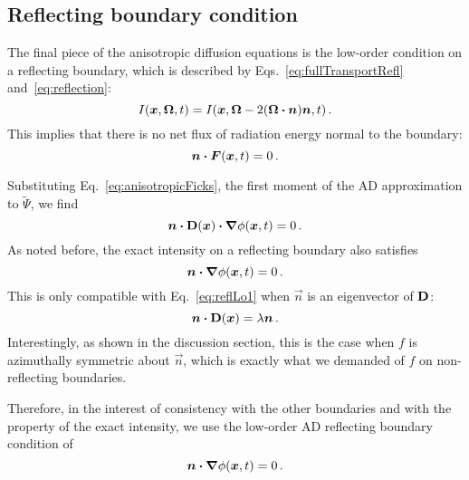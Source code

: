 \subsection{Reflecting boundary condition}
The final piece of the anisotropic diffusion equations is the low-order
condition on a reflecting boundary, which is described by
Eqs.~\eqref{eq:fullTransportRefl} and~\eqref{eq:reflection}:
\begin{equation*}
  I(\bm{x}, \bm{\Omega}, t)
  = I(\bm{x}, \bm{\Omega} - 2(\bm{\Omega} \bm{\cdot} \bm{n}) \bm{n}, t) \,.
\end{equation*}
This implies that there is no net flux of radiation energy normal to the
boundary:
\begin{equation}\label{eq:reflFirst}
  \bm{n} \bm{\cdot} \bm{F}(\bm{x}, t) = 0\,.
\end{equation}

Substituting Eq.~\eqref{eq:anisotropicFicks}, the first moment of the AD
approximation to $\tilde\Psi$, we find
\begin{equation}\label{eq:reflLo1}
  \bm{n} \bm{\cdot} \mathbf{D}(\bm{x}) \bm{\cdot} \bm{\nabla} \phi(\bm{x}, t) = 0\,.
\end{equation}
As noted before, the exact intensity on a reflecting boundary also satisfies
\begin{equation}\label{eq:reflZeroth}
  \bm{n}\bm{\cdot}\bm{\nabla} \phi(\bm{x}, t) = 0 \,.
\end{equation}
This is only compatible with Eq.~\eqref{eq:reflLo1} when $\vec{n}$ is an
eigenvector of $\mathbf{D}$:
\begin{equation*}
  \bm{n} \bm{\cdot} \mathbf{D}(\bm{x}) = \lambda \bm{n}\,.
\end{equation*}
Interestingly, as shown in the discussion section, this is the case when $f$ is
azimuthally symmetric about
$\vec{n}$, which is exactly what we demanded of $f$ on non-reflecting boundaries.

Therefore, in the interest of consistency with the other boundaries and with the
property of the exact intensity, we use the low-order AD reflecting boundary
condition of
\begin{equation}\label{eq:reflLo2}
  \bm{n} \bm{\cdot} \bm{\nabla} \phi(\bm{x}, t) = 0\,.
\end{equation}


